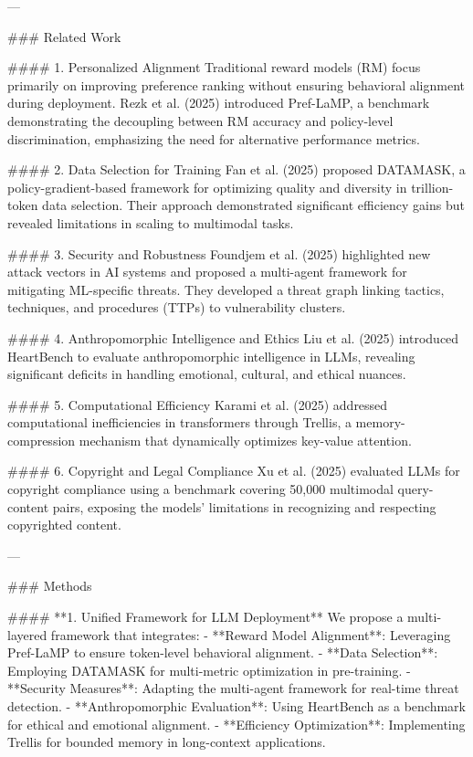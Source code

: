 ---

### Related Work  

#### 1. Personalized Alignment  
Traditional reward models (RM) focus primarily on improving preference ranking without ensuring behavioral alignment during deployment. Rezk et al. (2025) introduced Pref-LaMP, a benchmark demonstrating the decoupling between RM accuracy and policy-level discrimination, emphasizing the need for alternative performance metrics.

#### 2. Data Selection for Training  
Fan et al. (2025) proposed DATAMASK, a policy-gradient-based framework for optimizing quality and diversity in trillion-token data selection. Their approach demonstrated significant efficiency gains but revealed limitations in scaling to multimodal tasks.

#### 3. Security and Robustness  
Foundjem et al. (2025) highlighted new attack vectors in AI systems and proposed a multi-agent framework for mitigating ML-specific threats. They developed a threat graph linking tactics, techniques, and procedures (TTPs) to vulnerability clusters.

#### 4. Anthropomorphic Intelligence and Ethics  
Liu et al. (2025) introduced HeartBench to evaluate anthropomorphic intelligence in LLMs, revealing significant deficits in handling emotional, cultural, and ethical nuances.

#### 5. Computational Efficiency  
Karami et al. (2025) addressed computational inefficiencies in transformers through Trellis, a memory-compression mechanism that dynamically optimizes key-value attention.

#### 6. Copyright and Legal Compliance  
Xu et al. (2025) evaluated LLMs for copyright compliance using a benchmark covering 50,000 multimodal query-content pairs, exposing the models' limitations in recognizing and respecting copyrighted content.

---

### Methods  

#### **1. Unified Framework for LLM Deployment**  
We propose a multi-layered framework that integrates:  
- **Reward Model Alignment**: Leveraging Pref-LaMP to ensure token-level behavioral alignment.  
- **Data Selection**: Employing DATAMASK for multi-metric optimization in pre-training.  
- **Security Measures**: Adapting the multi-agent framework for real-time threat detection.  
- **Anthropomorphic Evaluation**: Using HeartBench as a benchmark for ethical and emotional alignment.  
- **Efficiency Optimization**: Implementing Trellis for bounded memory in long-context applications.  

